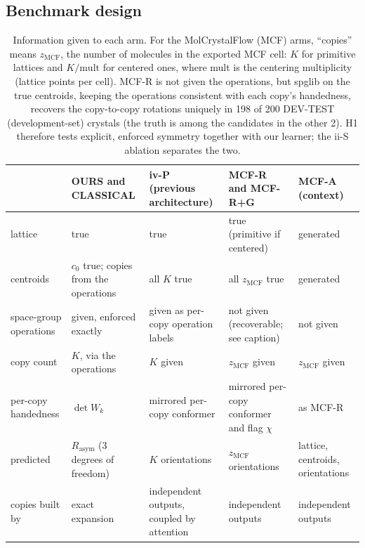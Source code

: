 \documentclass[journal=acsodf,manuscript=article]{achemso}
\begin{document}
\subsection{Benchmark design}
\begin{table}[t]
\caption{Information given to each arm. For the MolCrystalFlow (MCF) arms,
``copies'' means $z_{\mathrm{MCF}}$, the number of molecules in the exported MCF
cell: $K$ for primitive lattices and $K/\mathrm{mult}$ for centered ones, where
mult is the centering multiplicity (lattice points per cell). MCF-R is not given the operations, but
spglib on the true centroids, keeping the operations consistent with each copy's
handedness, recovers the copy-to-copy rotations uniquely in 198 of 200 DEV-TEST (development-set)
crystals (the truth is among the candidates in the other 2). H1 therefore tests
explicit, enforced symmetry together with our learner; the ii-S ablation
separates the two.}
\label{tab:info}
\small
\begin{tabular}{@{}p{2.3cm}p{2.9cm}p{2.6cm}p{3.0cm}p{2.5cm}@{}}
\toprule
 & OURS and CLASSICAL & iv-P (previous architecture) & MCF-R and MCF-R+G & MCF-A (context) \\
\midrule
lattice & true & true & true (primitive if centered) & generated \\
centroids & $c_0$ true; copies from the operations & all $K$ true & all $z_{\mathrm{MCF}}$ true & generated \\
space-group operations & given, enforced exactly & given as per-copy operation labels & not given (recoverable; see caption) & not given \\
copy count & $K$, via the operations & $K$ given & $z_{\mathrm{MCF}}$ given & $z_{\mathrm{MCF}}$ given \\
per-copy handedness & $\det W_k$ & mirrored per-copy conformer & mirrored per-copy conformer and flag $\chi$ & as MCF-R \\
predicted & $R_{\mathrm{asym}}$ (3 degrees of freedom) & $K$ orientations & $z_{\mathrm{MCF}}$ orientations & lattice, centroids, orientations \\
copies built by & exact expansion & independent outputs, coupled by attention & independent outputs & independent outputs \\
\bottomrule
\end{tabular}
\end{table}
\end{document}
